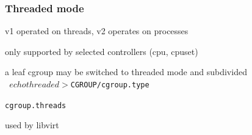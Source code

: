 \documentclass[serif]{beamer}
\begin{document}

\begin{frame}[fragile]
  \frametitle{Threaded mode}

  \pause

  v1 operated on threads, v2 operates on processes
  \medskip\pause

  only supported by selected controllers (cpu, cpuset)
  \medskip\pause

  a leaf cgroup may be switched to threaded mode and subdivided\\
  \texttt{        $ echo threaded > $CGROUP/cgroup.type}\\
  \pause

  \texttt{cgroup.threads}
  \medskip\pause

  used by libvirt
\end{frame}

\end{document}
